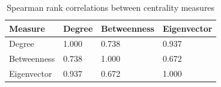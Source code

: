 \begin{table}[!ht]
\centering
\caption{Spearman rank correlations between centrality measures}
\label{tab:centrality-corr}
\begin{tabular}{llll}
\toprule
Measure & Degree & Betweenness & Eigenvector \\
\midrule
Degree & 1.000 & 0.738 & 0.937 \\
Betweenness & 0.738 & 1.000 & 0.672 \\
Eigenvector & 0.937 & 0.672 & 1.000 \\
\bottomrule
\end{tabular}
\end{table}
